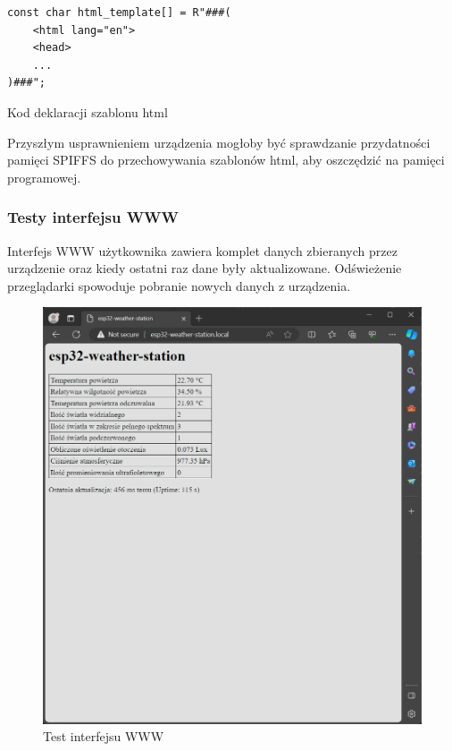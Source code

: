 \documentclass[12pt,a4paper]{article}
\begin{document}
\begin{code}[H]
\begin{verbatim}
const char html_template[] = R"###(
    <html lang="en">
    <head>
    ...
)###";
\end{verbatim}
\caption{Kod deklaracji szablonu html}
\label{html-template-code}
\end{code}

Przyszłym usprawnieniem urządzenia mogłoby być sprawdzanie przydatności pamięci SPIFFS do przechowywania szablonów html, aby oszczędzić na pamięci programowej.

\subsubsection{Testy interfejsu WWW}

Interfejs WWW użytkownika zawiera komplet danych zbieranych przez urządzenie oraz kiedy ostatni raz dane były aktualizowane. Odświeżenie przeglądarki spowoduje pobranie nowych danych z urządzenia.
\begin{figure}[H]
    \centering
    \includegraphics[width=\textwidth]{web-interface.png}
    \caption{Test interfejsu WWW}
\end{figure}
\end{document}
